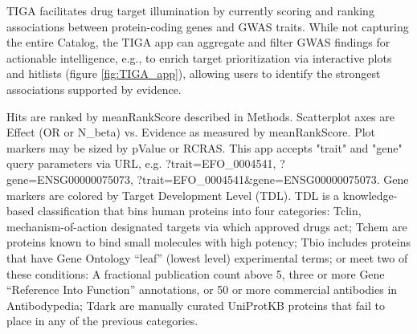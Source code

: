 TIGA facilitates drug target illumination by currently scoring and ranking associations between protein-coding genes and GWAS traits. While not capturing the entire Catalog, the TIGA app can aggregate and filter GWAS findings for actionable intelligence, e.g., to enrich target prioritization via interactive plots and hitlists (figure \ref{fig:TIGA_app}), allowing users to identify the strongest associations supported by evidence.

Hits are ranked by meanRankScore described in Methods. Scatterplot axes are Effect (OR or N\_beta) vs. Evidence as measured by meanRankScore. Plot markers may be sized by pValue or RCRAS. This app accepts "trait" and "gene" query parameters via URL, e.g. ?trait=EFO\_0004541, ?gene=ENSG00000075073, ?trait=EFO\_0004541\&gene=ENSG00000075073.  Gene markers are colored by Target Development Level (TDL)\cite{Oprea2018-cp}. TDL is a knowledge-based classification that bins human proteins into four categories: Tclin, mechanism-of-action designated targets via which approved drugs act\cite{Santos2017-sd,Ursu2019-hx,Avram2020-ff}; Tchem are proteins known to bind small molecules with high potency; Tbio includes proteins that have Gene Ontology\cite{Ashburner2000-aw} “leaf” (lowest level) experimental terms; or meet two of these conditions:  A fractional publication count\cite{Pafilis2013-ml} above 5, three or more Gene “Reference Into Function” annotations\cite{Mitchell2003-ty}, or 50 or more commercial antibodies in Antibodypedia\cite{Bjorling2008-ia}; Tdark are manually curated UniProtKB proteins that fail to place in any of the previous categories.


